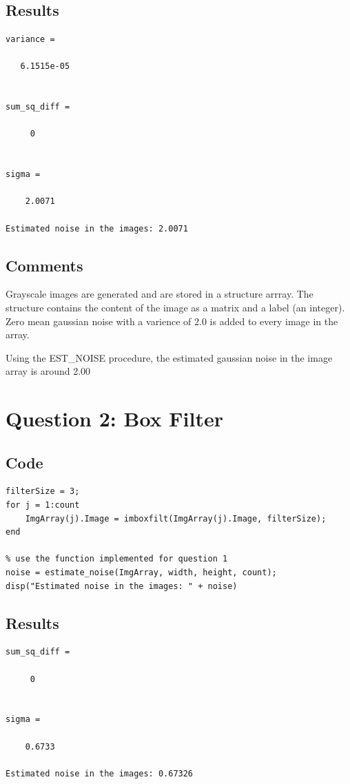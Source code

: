 \documentclass{article}
\begin{document}
\subsection{Results}

\begin{verbatim}
variance =

   6.1515e-05


sum_sq_diff =

     0


sigma =

    2.0071

Estimated noise in the images: 2.0071

\end{verbatim}  


\subsection{Comments}
Grayscale images are generated and are stored in a structure arrray. The structure contains the content of the image as a matrix and a label (an integer).
Zero mean gaussian noise with a varience of 2.0 is added to every image in the array.

Using the EST\_NOISE procedure, the estimated gaussian noise in the image array is around 2.00



\section{Question 2: Box Filter}

\subsection{Code}
\begin{verbatim}
filterSize = 3;
for j = 1:count
    ImgArray(j).Image = imboxfilt(ImgArray(j).Image, filterSize);
end

% use the function implemented for question 1
noise = estimate_noise(ImgArray, width, height, count);
disp("Estimated noise in the images: " + noise)
\end{verbatim}

\subsection{Results}

\begin{verbatim}
sum_sq_diff =

     0


sigma =

    0.6733

Estimated noise in the images: 0.67326  
\end{verbatim}  
\end{document}
